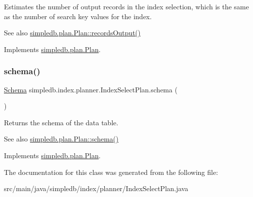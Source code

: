 Estimates the number of output records in the index selection, which is the same as the number of search key values for the index. \begin{DoxySeeAlso}{See also}
\hyperlink{interfacesimpledb_1_1plan_1_1Plan_a187e06657d356c80a7f743d7ff8fd257}{simpledb.\+plan.\+Plan\+::records\+Output()} 
\end{DoxySeeAlso}


Implements \hyperlink{interfacesimpledb_1_1plan_1_1Plan_a187e06657d356c80a7f743d7ff8fd257}{simpledb.\+plan.\+Plan}.

\mbox{\label{classsimpledb_1_1index_1_1planner_1_1IndexSelectPlan_a3010453110b539de5e3af184131dee7a}} 
\subsubsection{\texorpdfstring{schema()}{schema()}}
{\footnotesize\ttfamily \hyperlink{classsimpledb_1_1record_1_1Schema}{Schema} simpledb.\+index.\+planner.\+Index\+Select\+Plan.\+schema (\begin{DoxyParamCaption}{ }\end{DoxyParamCaption})\hspace{0.3cm}{\ttfamily [inline]}}

Returns the schema of the data table. \begin{DoxySeeAlso}{See also}
\hyperlink{interfacesimpledb_1_1plan_1_1Plan_ad0ee1aa2c4e7147e9f8fc6f3301fa986}{simpledb.\+plan.\+Plan\+::schema()} 
\end{DoxySeeAlso}


Implements \hyperlink{interfacesimpledb_1_1plan_1_1Plan_ad0ee1aa2c4e7147e9f8fc6f3301fa986}{simpledb.\+plan.\+Plan}.



The documentation for this class was generated from the following file\+:\begin{DoxyCompactItemize}
\item 
src/main/java/simpledb/index/planner/Index\+Select\+Plan.\+java\end{DoxyCompactItemize}
